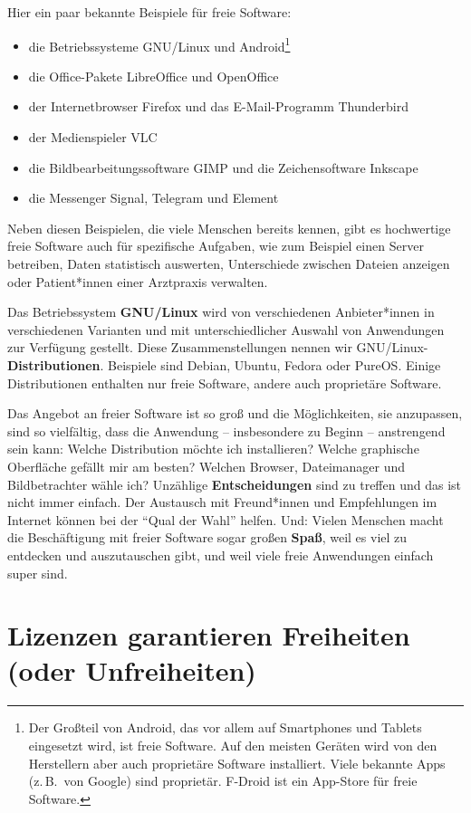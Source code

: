 \documentclass[a5paper,12pt]{scrartcl}
\begin{document}
Hier ein paar bekannte Beispiele für freie Software:
\begin{itemize}
\item die Betriebssysteme GNU/Linux und Android\footnote{Der Großteil
    von Android, das vor allem auf Smartphones und Tablets eingesetzt
    wird, ist freie Software. Auf den meisten Geräten wird von den
    Herstellern aber auch proprietäre Software installiert. Viele
    bekannte Apps (z.\,B.\ von Google) sind proprietär. F-Droid ist
    ein App-Store für freie Software.}
\item die Office-Pakete LibreOffice und OpenOffice
\item der Internetbrowser Firefox und das E-Mail-Programm Thunderbird
\item der Medienspieler VLC
\item die Bildbearbeitungssoftware GIMP und die Zeichensoftware
  Inkscape
\item die Messenger Signal, Telegram und Element
\end{itemize}

Neben diesen Beispielen, die viele Menschen bereits kennen, gibt es
hochwertige freie Software auch für spezifische Aufgaben, wie zum
Beispiel einen Server betreiben, Daten statistisch auswerten,
Unterschiede zwischen Dateien anzeigen oder Patient*innen einer
Arztpraxis verwalten.

Das Betriebssystem \textbf{GNU/Linux} wird von verschiedenen
Anbieter*innen in verschiedenen Varianten und mit unterschiedlicher
Auswahl von Anwendungen zur Verfügung gestellt. Diese
Zusammenstellungen nennen wir
GNU/Linux-\textbf{Distributionen}. Beispiele sind Debian, Ubuntu,
Fedora oder PureOS. Einige Distributionen enthalten nur freie
Software, andere auch proprietäre Software.

Das Angebot an freier Software ist so groß und die Möglichkeiten, sie
anzupassen, sind so vielfältig, dass die Anwendung -- insbesondere zu
Beginn -- anstrengend sein kann: Welche Distribution möchte ich
installieren? Welche graphische Oberfläche gefällt mir am besten?
Welchen Browser, Dateimanager und Bildbetrachter wähle ich? Unzählige
\textbf{Entscheidungen} sind zu treffen und das ist nicht immer
einfach. Der Austausch mit Freund*innen und Empfehlungen im Internet
können bei der "`Qual der Wahl"' helfen. Und: Vielen Menschen macht
die Beschäftigung mit freier Software sogar großen \textbf{Spaß}, weil
es viel zu entdecken und auszutauschen gibt, und weil viele freie
Anwendungen einfach super sind.


\section{Lizenzen garantieren Freiheiten (oder Unfreiheiten)}
\end{document}
